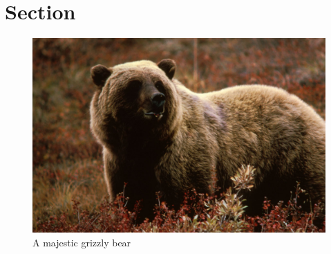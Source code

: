 \documentclass[10pt, a4paper, twocolumn]{article} %
\begin{document}

\section{Section}

\begin{figure}[htpb!]
	\includegraphics[width=\linewidth]{bear.jpg} %
	\caption{A majestic grizzly bear} %
	\label{bear} %
\end{figure}


\printbibliography[title={Bibliography}] %

\end{document}
